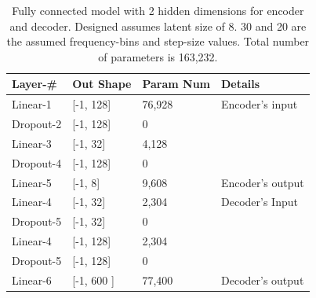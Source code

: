\documentclass[\main/thesis.tex]{subfiles}
\begin{document}
\begin{table}[[h]

\begin{tabular}{|p{28mm}|p{25mm}|p{23mm}|p{50mm}|}
\hline
Layer-\# & Out Shape & Param Num & Details  \\ \hline
Linear-1 & [-1, 128]  & 76,928 & Encoder's input \\ \hline
Dropout-2 & [-1, 128] & 0 &  \\ \hline
Linear-3 & [-1, 32]  & 4,128 & \\ \hline
Dropout-4 & [-1, 128] & 0 &  \\ \hline
Linear-5 & [-1, 8] & 9,608 & Encoder's output \\ \hline
Linear-4 & [-1, 32] & 2,304 & Decoder's Input \\ \hline
Dropout-5 & [-1, 32]  & 0 &  \\ \hline
Linear-4 & [-1, 128] & 2,304 & \\ \hline
Dropout-5 & [-1, 128]  & 0 &  \\ \hline
Linear-6  & [-1, 600 ] &  77,400 &Decoder's output\\ \hline
\end{tabular}
\caption{Fully connected model with 2 hidden dimensions for encoder and decoder. Designed assumes latent size of 8. 30 and 20 are the assumed frequency-bins and step-size values. Total number of parameters is 163,232.}
\label{table:FC2_AUTOENCODER}
\end{table}
\end{document}
